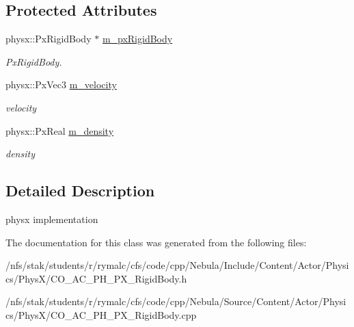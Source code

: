 \subsection*{Protected Attributes}
\begin{DoxyCompactItemize}
\item 
\hypertarget{classContent_1_1Actor_1_1Physics_1_1PhysX_1_1RigidBody_a0ba0c551f3ec725d8d733ddf6ba1b020}{
physx::PxRigidBody $\ast$ \hyperlink{classContent_1_1Actor_1_1Physics_1_1PhysX_1_1RigidBody_a0ba0c551f3ec725d8d733ddf6ba1b020}{m\_\-pxRigidBody}}
\label{classContent_1_1Actor_1_1Physics_1_1PhysX_1_1RigidBody_a0ba0c551f3ec725d8d733ddf6ba1b020}

\begin{DoxyCompactList}\small\item\em PxRigidBody. \item\end{DoxyCompactList}\item 
\hypertarget{classContent_1_1Actor_1_1Physics_1_1PhysX_1_1RigidBody_a0db126404b309f42416f69137266fbfe}{
physx::PxVec3 \hyperlink{classContent_1_1Actor_1_1Physics_1_1PhysX_1_1RigidBody_a0db126404b309f42416f69137266fbfe}{m\_\-velocity}}
\label{classContent_1_1Actor_1_1Physics_1_1PhysX_1_1RigidBody_a0db126404b309f42416f69137266fbfe}

\begin{DoxyCompactList}\small\item\em velocity \item\end{DoxyCompactList}\item 
\hypertarget{classContent_1_1Actor_1_1Physics_1_1PhysX_1_1RigidBody_a5b0422b418c82b69118d82bb22cb0a50}{
physx::PxReal \hyperlink{classContent_1_1Actor_1_1Physics_1_1PhysX_1_1RigidBody_a5b0422b418c82b69118d82bb22cb0a50}{m\_\-density}}
\label{classContent_1_1Actor_1_1Physics_1_1PhysX_1_1RigidBody_a5b0422b418c82b69118d82bb22cb0a50}

\begin{DoxyCompactList}\small\item\em density \item\end{DoxyCompactList}\end{DoxyCompactItemize}


\subsection{Detailed Description}
physx implementation 

The documentation for this class was generated from the following files:\begin{DoxyCompactItemize}
\item 
/nfs/stak/students/r/rymalc/cfs/code/cpp/Nebula/Include/Content/Actor/Physics/PhysX/CO\_\-AC\_\-PH\_\-PX\_\-RigidBody.h\item 
/nfs/stak/students/r/rymalc/cfs/code/cpp/Nebula/Source/Content/Actor/Physics/PhysX/CO\_\-AC\_\-PH\_\-PX\_\-RigidBody.cpp\end{DoxyCompactItemize}
